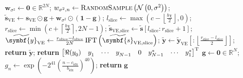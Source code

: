 \begin{algorithm}
\begin{algorithmic}
            \State $\symbf{w}_{\sigma^2} \gets \symbf{0} \in \mathbb{R}^{2N}$;
            \State $w_{\sigma^2,n} \gets \textsc{RandomSample}\left(\mathcal{N}\left(0, \sigma^2\right)\right)$;
            \EndFor
            \State $\widetilde{\symbf{s}}_{\text{VE}} \gets \symbf{s}_{\text{VE}} \odot \symbf{g} + \symbf{w}_{\sigma^2} \odot \left(\symbf{1} - \symbf{g}\right)$;
            \State $l_{\text{slice}} \gets \max\left( c - \left \lfloor \frac{b \chi}{2} \right \rfloor, 0 \right)$;
            \State $r_{\text{slice}} \gets \min\left( c + \left \lceil \frac{b \chi}{2} \right \rceil, 2N - 1 \right)$;
            \State $\widetilde{\symbf{s}}_{\text{VE,slice}} \gets \widetilde{\symbf{s}} [l_{\text{slice}} : r_{\text{slice}} + 1]$;
            \State $\widetilde{\symbf{y}}_{\text{VE}} \gets
                \frac{r_{\text{slice}} - l_{\text{slice}}}{2N} \IFT \left(
                \widetilde{\symbf{s}}_{\text{VE,slice}} \right)$;
            \State $\widetilde{\symbf{y}} \gets \widetilde{\symbf{y}}_{\text{VE}}
                \left[:\left \lfloor \frac{r_{\text{slice}} - l_{\text{slice}}}{2}\right \rfloor \right]$;
            \State \textbf{return} $\widetilde{\symbf{y}}$;
        \EndProcedure
        \Statex
            \State \textbf{return} $
            \begin{bmatrix}
                \Re(y_0^{\vphantom{*}}) & y_1^{\vphantom{*}} & \cdots & y_{N-1}^{\vphantom{*}} & 0 & y_{N-1}^* & \cdots & y_1^*
            \end{bmatrix}^{\mathrm{T}}
            $
        \EndProcedure
        \Statex
            \State $\symbf{g} \gets \symbf{0} \in \mathbb{R}^{N}$;
                \State $g_n \gets \exp\left(
                    -2^{41} \left(
                        \frac{n - c_{\text{idx}}}{b_{\text{idx}}}
                    \right)^{40}
                    \right)
                $;
            \EndFor
            \State \textbf{return} $\symbf{g}$
        \EndProcedure
    \end{algorithmic}
\end{algorithm}
